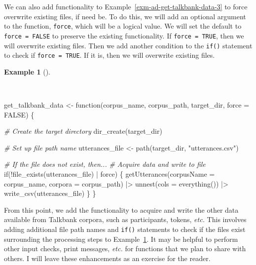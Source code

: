 \documentclass[
  letterpaper,
]{latex/krantz}
\newenvironment{Shaded}{\begin{snugshade}}{\end{snugshade}}
\newcommand{\AttributeTok}[1]{\textcolor[rgb]{0.00,0.00,0.00}{#1}}
\newcommand{\CommentTok}[1]{\textcolor[rgb]{0.00,0.00,0.00}{\textit{#1}}}
\newcommand{\ConstantTok}[1]{\textcolor[rgb]{0.00,0.00,0.00}{#1}}
\newcommand{\ControlFlowTok}[1]{\textcolor[rgb]{0.00,0.00,0.00}{#1}}
\newcommand{\FunctionTok}[1]{\textcolor[rgb]{0.00,0.00,0.00}{#1}}
\newcommand{\NormalTok}[1]{\textcolor[rgb]{0.00,0.00,0.00}{#1}}
\newcommand{\OtherTok}[1]{\textcolor[rgb]{0.00,0.00,0.00}{#1}}
\newcommand{\SpecialCharTok}[1]{\textcolor[rgb]{0.00,0.00,0.00}{#1}}
\newcommand{\StringTok}[1]{\textcolor[rgb]{0.00,0.00,0.00}{#1}}
\theoremstyle{definition}
\newtheorem{example}{Example}[chapter]
\theoremstyle{remark}
\begin{document}
We can also add functionality to
Example~\ref{exm-ad-get-talkbank-data-3} to force overwrite existing
files, if need be. To do this, we will add an optional argument to the
function, \texttt{force}, which will be a logical value. We will set the
default to \texttt{force\ =\ FALSE} to preserve the existing
functionality. If \texttt{force\ =\ TRUE}, then we will overwrite
existing files. Then we add another condition to the \texttt{if()}
statement to check if \texttt{force\ =\ TRUE}. If it is, then we will
overwrite existing files.

\begin{example}[]\protect\hypertarget{exm-ad-get-talkbank-data-4}{}\label{exm-ad-get-talkbank-data-4}

~

\begin{Shaded}
\begin{Highlighting}[]
\NormalTok{get\_talkbank\_data }\OtherTok{\textless{}{-}} \ControlFlowTok{function}\NormalTok{(corpus\_name, corpus\_path, target\_dir, }\AttributeTok{force =} \ConstantTok{FALSE}\NormalTok{) \{}

  \CommentTok{\# Create the target directory}
  \FunctionTok{dir\_create}\NormalTok{(target\_dir)}

  \CommentTok{\# Set up file path name}
\NormalTok{  utterances\_file  }\OtherTok{\textless{}{-}} \FunctionTok{path}\NormalTok{(target\_dir, }\StringTok{"utterances.csv"}\NormalTok{)}

  \CommentTok{\# If the file does not exist, then...}
  \CommentTok{\# Acquire data and write to file}
  \ControlFlowTok{if}\NormalTok{(}\SpecialCharTok{!}\FunctionTok{file\_exists}\NormalTok{(utterances\_file) }\SpecialCharTok{|}\NormalTok{ force) \{}
    \FunctionTok{getUtterances}\NormalTok{(}\AttributeTok{corpusName =}\NormalTok{ corpus\_name, }\AttributeTok{corpora =}\NormalTok{ corpus\_path) }\SpecialCharTok{|\textgreater{}}
      \FunctionTok{unnest}\NormalTok{(}\AttributeTok{cols =} \FunctionTok{everything}\NormalTok{()) }\SpecialCharTok{|\textgreater{}}
      \FunctionTok{write\_csv}\NormalTok{(utterances\_file)}
\NormalTok{  \}}
\NormalTok{\}}
\end{Highlighting}
\end{Shaded}

\end{example}

From this point, we add the functionality to acquire and write the other
data available from Talkbank corpora, such as participants, tokens,
\emph{etc.} This involves adding additional file path names and
\texttt{if()} statements to check if the files exist surrounding the
processing steps to Example~\ref{exm-ad-get-talkbank-data-4}. It may be
helpful to perform other input checks, print messages, \emph{etc.} for
functions that we plan to share with others. I will leave these
enhancements as an exercise for the reader.
\end{document}
